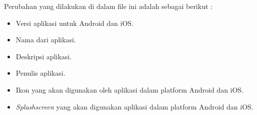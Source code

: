 Perubahan yang dilakukan di dalam file ini adalah sebagai berikut : 

\begin{itemize}
\item Versi aplikasi untuk Android dan iOS.
\item Nama dari aplikasi.
\item Deskripsi aplikasi.
\item Penulis aplikasi.
\item Ikon yang akan digunakan oleh aplikasi dalam platform Android dan iOS.
\item \textit{Splashscreen} yang akan digunakan aplikasi dalam platform Android dan iOS.
\end{itemize}  